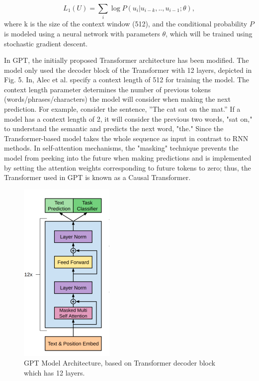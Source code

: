 \documentclass[conference]{IEEEtran}
\begin{document}
\begin{equation}
L_1(U) = \sum_{i} \log P(u_i|u_{i-k},..,u_{i-1}; \theta),
\end{equation}
where k is the size of the context window (512), and the conditional probability \(P\) is modeled using a neural network with parameters \(\theta\), which will be trained using stochastic gradient descent.



In GPT, the initially proposed Transformer architecture has been modified. The model only used the decoder block of the Transformer with 12 layers, depicted in Fig. 5. In\cite{b10}, Alec et al. specify a context length of 512 for training the model. The context length parameter determines the number of previous tokens (words/phrases/characters) the model will consider when making the next prediction. For example, consider the sentence, ''The cat sat on the mat.'' If a model has a context length of 2, it will consider the previous two words, "sat on," to understand the semantic and predicts the next word, "the." Since the Transformer-based model takes the whole sequence as input in contrast to RNN methods. In self-attention mechanisms, the  "masking" technique prevents the model from peeking into the future when making predictions and is implemented by setting the attention weights corresponding to future tokens to zero; thus, the Transformer used in GPT is known as a Causal Transformer.


\begin{figure}[htbp]
\centerline{\includegraphics[scale=0.5]{Images/gpt_architecture.png}}
\caption{GPT Model Architecture, based on Transformer decoder block which has 12 layers\cite{b10}.}
\label{fig}
\end{figure}
\end{document}
